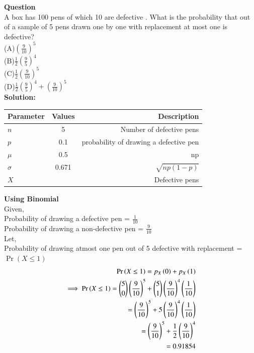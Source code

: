 \documentclass[journal,12pt,onecolumn]{IEEEtran}
\newcommand{\solution}{\noindent \textbf{Solution: }}
\providecommand{\pr}[1]{\ensuremath{\Pr\left(#1\right)}}
\begin{document}
\textbf{Question }\\
A box has 100 pens of which 10 are defective . What is the probability that out of a sample of 5 pens drawn one by one with replacement at most one is defective?\\
(A)$\left(\frac{9}{10}\right)^5$\\
(B)$\frac{1}{2}\left(\frac{9}{5}\right)^4$\\
(C)$\frac{1}{2}\left(\frac{9}{10}\right)^5$\\
(D)$\frac{1}{2}\left(\frac{9}{5}\right)^4+\left(\frac{9}{10}\right)^5 $\\
\solution\\
\begin{table}[!ht]
\centering
\begin{tabular}{|l|c|r|}
    \hline
    Parameter & Values & Description\\
    \hline
    $n$ & 5 & Number of defective pens \\
    \hline
    $p$ & 0.1 &probability of drawing a defective pen \\
    \hline
    $\mu$ & 0.5 & np \\
    \hline
    $\sigma $ & 0.671 & $\sqrt{np(1-p)} $\\
    \hline
    $ X $ &  &  Defective pens \\
    \hline
\end{tabular}
\label{tab:gaussian/9/3/33}
\end{table}

\textbf{Using Binomial}\\
Given,\\
Probability of drawing a defective pen = $\frac{1}{10}$\\
Probability of drawing a non-defective pen = $\frac{9}{10}$\\
Let,\\
Probability of drawing atmost one pen out of 5 defective with replacement = $\pr{X \le 1}$
\begin{align}
\pr{X \le 1} = p_X\brak{0} + p_X\brak{1}\\
\implies \pr{X \le 1} = \binom{5}{0}\left(\frac{9}{10}\right)^5 + \binom{5}{1}\left(\frac{9}{10}\right)^4\left(\frac{1}{10}\right)\\
= \left(\frac{9}{10}\right)^5 + 5\left(\frac{9}{10}\right)^4\left(\frac{1}{10}\right)\\
= \left(\frac{9}{10}\right)^5 + \frac{1}{2}\left(\frac{9}{10}\right)^4\\
= 0.91854
\end{align}
\end{document}
